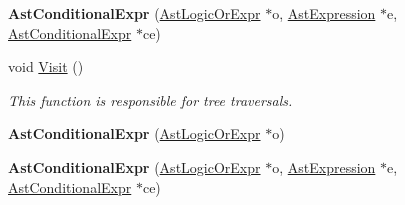 \begin{DoxyCompactItemize}
\item 
\hypertarget{classAstConditionalExpr_aa65a02af9e4ccd958607efcdabdc195f}{{\bfseries Ast\-Conditional\-Expr} (\hyperlink{classAstLogicOrExpr}{Ast\-Logic\-Or\-Expr} $\ast$o, \hyperlink{classAstExpression}{Ast\-Expression} $\ast$e, \hyperlink{classAstConditionalExpr}{Ast\-Conditional\-Expr} $\ast$ce)}\label{classAstConditionalExpr_aa65a02af9e4ccd958607efcdabdc195f}

\item 
void \hyperlink{classAstConditionalExpr_af62c2b118fd6064ec838435ffa72f48c}{Visit} ()
\begin{DoxyCompactList}\small\item\em This function is responsible for tree traversals. \end{DoxyCompactList}\item 
\hypertarget{classAstConditionalExpr_a4adcfd01b6eb5f4fb693e085a27953ee}{{\bfseries Ast\-Conditional\-Expr} (\hyperlink{classAstLogicOrExpr}{Ast\-Logic\-Or\-Expr} $\ast$o)}\label{classAstConditionalExpr_a4adcfd01b6eb5f4fb693e085a27953ee}

\item 
\hypertarget{classAstConditionalExpr_aa65a02af9e4ccd958607efcdabdc195f}{{\bfseries Ast\-Conditional\-Expr} (\hyperlink{classAstLogicOrExpr}{Ast\-Logic\-Or\-Expr} $\ast$o, \hyperlink{classAstExpression}{Ast\-Expression} $\ast$e, \hyperlink{classAstConditionalExpr}{Ast\-Conditional\-Expr} $\ast$ce)}\label{classAstConditionalExpr_aa65a02af9e4ccd958607efcdabdc195f}


\end{DoxyCompactItemize}
